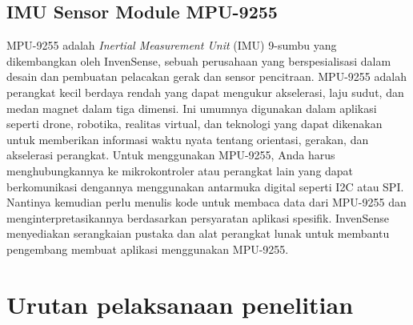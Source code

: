 \subsection{IMU Sensor Module MPU-9255}
MPU-9255 adalah \emph{Inertial Measurement Unit} (IMU) 9-sumbu yang dikembangkan oleh InvenSense, sebuah perusahaan yang berspesialisasi dalam desain dan pembuatan pelacakan gerak dan sensor 
pencitraan. MPU-9255 adalah perangkat kecil berdaya rendah yang dapat mengukur akselerasi, laju sudut, dan medan magnet dalam tiga dimensi. Ini umumnya digunakan dalam aplikasi seperti 
drone, robotika, realitas virtual, dan teknologi yang dapat dikenakan untuk memberikan informasi waktu nyata tentang orientasi, gerakan, dan akselerasi perangkat. 
Untuk menggunakan MPU-9255, Anda harus menghubungkannya ke mikrokontroler atau perangkat lain yang dapat berkomunikasi dengannya menggunakan antarmuka digital seperti I2C atau SPI. 
Nantinya kemudian perlu menulis kode untuk membaca data dari MPU-9255 dan menginterpretasikannya berdasarkan persyaratan aplikasi spesifik. InvenSense menyediakan serangkaian 
pustaka dan alat perangkat lunak untuk membantu pengembang membuat aplikasi menggunakan MPU-9255.

\section{Urutan pelaksanaan penelitian}

